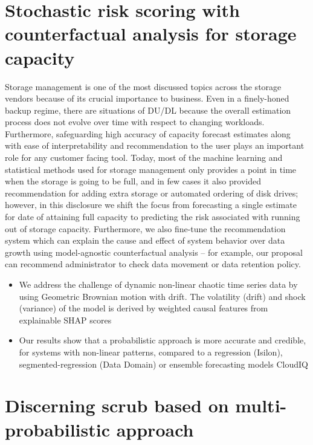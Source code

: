 \documentclass{article}
\begin{document}
\section{Stochastic risk scoring with counterfactual analysis for storage capacity}

Storage management is one of the most discussed topics across the storage vendors because of its crucial importance to business. Even in a finely-honed backup regime, there are situations of DU/DL because the overall estimation process does not evolve over time with respect to changing workloads. Furthermore, safeguarding high accuracy of capacity forecast estimates along with ease of interpretability and recommendation to the user plays an important role for any customer facing tool. 
Today, most of the machine learning and statistical methods used for storage management only provides a point in time when the storage is going to be full, and in few cases it also provided recommendation for adding extra storage or automated ordering of disk drives; however, in this disclosure we shift the focus from forecasting a single estimate for date of attaining full capacity to predicting the risk associated with running out of storage capacity. Furthermore, we also fine-tune the recommendation system which can explain the cause and effect of system behavior over data growth using model-agnostic counterfactual analysis – for example, our proposal can recommend administrator to check data movement or data retention policy.  

\begin{itemize} \itemsep 1pt

\item {We address the challenge of dynamic non-linear chaotic time series data by using Geometric Brownian motion with drift. The volatility (drift) and shock (variance) of the model is derived by weighted causal features from explainable SHAP scores}  

\item {Our results show that a probabilistic approach is more accurate and credible, for systems with non-linear patterns, compared to a regression (Isilon), segmented-regression (Data Domain) or ensemble forecasting models CloudIQ}

\end{itemize}


\section{Discerning scrub based on multi-probabilistic approach}
\end{document}
